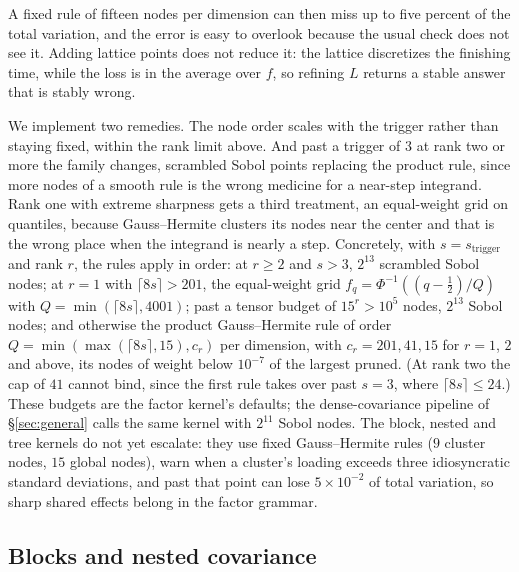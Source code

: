 \documentclass[11pt]{article}
\begin{document}
A fixed rule of fifteen nodes per dimension can then miss up to five
percent of the total variation, and the error is easy to overlook because
the usual check does not see it. Adding lattice points does not reduce
it: the lattice discretizes the finishing time, while the loss is in the
average over $f$, so refining $L$ returns a stable answer that is stably
wrong.

We implement two remedies. The node order scales with the trigger rather
than staying fixed, within the rank limit above. And past a trigger of
$3$ at rank two or more the
family changes, scrambled Sobol points replacing the product rule, since
more nodes of a smooth rule is the wrong medicine for a near-step
integrand. Rank one with extreme sharpness gets a third treatment, an
equal-weight grid on quantiles, because Gauss--Hermite clusters its nodes
near the center and that is the wrong place when the integrand is nearly
a step. Concretely, with $s=s_{\mathrm{trigger}}$ and rank $r$, the rules
apply in order: at $r\ge2$ and $s>3$, $2^{13}$ scrambled Sobol nodes; at
$r=1$ with $\lceil8s\rceil>201$, the equal-weight grid
$f_q=\Phi^{-1}((q-\tfrac12)/Q)$ with $Q=\min(\lceil8s\rceil,4001)$;
past a tensor budget of $15^r>10^5$ nodes, $2^{13}$ Sobol nodes; and
otherwise the product Gauss--Hermite rule of order
$Q=\min(\max(\lceil8s\rceil,15),c_r)$ per dimension, with
$c_r=201,41,15$ for $r=1$, $2$ and above, its nodes of weight below
$10^{-7}$ of the largest pruned. (At rank two the cap of $41$ cannot
bind, since the first rule takes over past $s=3$, where
$\lceil8s\rceil\le24$.) These budgets are the factor kernel's defaults;
the dense-covariance pipeline of \S\ref{sec:general} calls the same
kernel with $2^{11}$ Sobol nodes. The block, nested and tree kernels do
not yet escalate: they use fixed Gauss--Hermite rules ($9$ cluster
nodes, $15$ global nodes), warn when a cluster's loading exceeds three
idiosyncratic standard deviations, and past that point can lose
$5\times10^{-2}$ of total variation, so sharp shared effects belong in
the factor grammar.


\subsection{Blocks and nested covariance}\label{sec:blocks}
\end{document}
